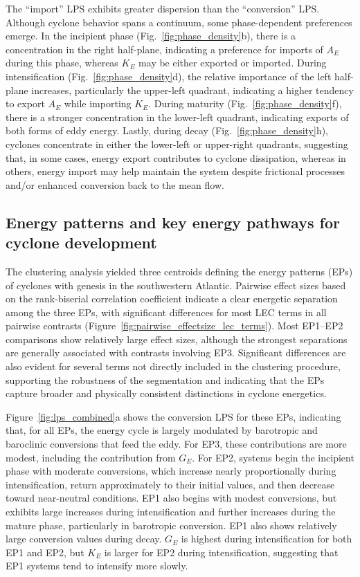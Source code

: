 \documentclass[pdflatex,sn-chicago]{sn-jnl}%
\theoremstyle{plain}
\theoremstyle{definition}
\theoremstyle{remark}
\theoremstyle{definition}
\begin{document}
The ``import'' LPS exhibits greater dispersion than the ``conversion'' LPS. Although cyclone behavior spans a continuum, some phase-dependent preferences emerge. In the incipient phase (Fig.~\ref{fig:phase_density}b), there is a concentration in the right half-plane, indicating a preference for imports of $A_E$ during this phase, whereas $K_E$ may be either exported or imported. During intensification (Fig.~\ref{fig:phase_density}d), the relative importance of the left half-plane increases, particularly the upper-left quadrant, indicating a higher tendency to export $A_E$ while importing $K_E$. During maturity (Fig.~\ref{fig:phase_density}f), there is a stronger concentration in the lower-left quadrant, indicating exports of both forms of eddy energy. Lastly, during decay (Fig.~\ref{fig:phase_density}h), cyclones concentrate in either the lower-left or upper-right quadrants, suggesting that, in some cases, energy export contributes to cyclone dissipation, whereas in others, energy import may help maintain the system despite frictional processes \citep{de2025lorenz} and/or enhanced conversion back to the mean flow.


\subsection{Energy patterns and key energy pathways for cyclone development}
\label{sec:energy_patterns}

The clustering analysis yielded three centroids defining the energy patterns (EPs) of cyclones with genesis in the southwestern Atlantic. Pairwise effect sizes based on the rank-biserial correlation coefficient indicate a clear energetic separation among the three EPs, with significant differences for most LEC terms in all pairwise contrasts (Figure~\ref{fig:pairwise_effectsize_lec_terms}). Most EP1--EP2 comparisons show relatively large effect sizes, although the strongest separations are generally associated with contrasts involving EP3. Significant differences are also evident for several terms not directly included in the clustering procedure, supporting the robustness of the segmentation and indicating that the EPs capture broader and physically consistent distinctions in cyclone energetics.

Figure~\ref{fig:lps_combined}a shows the conversion LPS for these EPs, indicating that, for all EPs, the energy cycle is largely modulated by barotropic and baroclinic conversions that feed the eddy. For EP3, these contributions are more modest, including the contribution from $G_E$. For EP2, systems begin the incipient phase with moderate conversions, which increase nearly proportionally during intensification, return approximately to their initial values, and then decrease toward near-neutral conditions. EP1 also begins with modest conversions, but exhibits large increases during intensification and further increases during the mature phase, particularly in barotropic conversion. EP1 also shows relatively large conversion values during decay. $G_E$ is highest during intensification for both EP1 and EP2, but $K_E$ is larger for EP2 during intensification, suggesting that EP1 systems tend to intensify more slowly.
\end{document}
